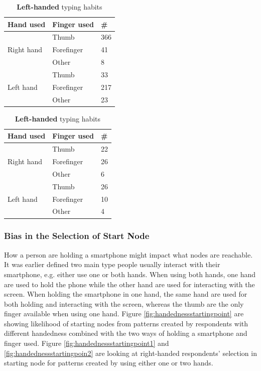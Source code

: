       \begin{table}[H]
        \parbox{.5\linewidth}{
          \centering
          \begin{tabular}{ l | l | l }
            \hline
            {\bf Hand used} & {\bf Finger used} & {\bf \#} \\ \hline
            \multirow{3}{*}{Right hand} & Thumb & 366 \\
            & Forefinger & 41 \\
            & Other & 8 \\ \hline
            \multirow{3}{*}{Left hand} & Thumb & 33 \\
            & Forefinger & 217 \\
            & Other & 23 \\ \hline
          \end{tabular}
          \caption{{\bf Right-handed} typing habits}
          \label{tab:righthandfinger}
        }
        \hfill
        \parbox{.5\linewidth}{
          \centering
          \begin{tabular}{ l | l | l }
            \hline
            {\bf Hand used} & {\bf Finger used} & {\bf \#} \\ \hline
            \multirow{3}{*}{Right hand} & Thumb & 22 \\ 
            & Forefinger & 26 \\
            & Other & 6 \\ \hline
            \multirow{3}{*}{Left hand} & Thumb & 26 \\ 
            & Forefinger & 10 \\
            & Other & 4 \\ \hline
          \end{tabular}
          \caption{{\bf Left-handed} typing habits}
          \label{tab:lefthandfinger}
        }
      \end{table}

    \subsubsection{Bias in the Selection of Start Node}
      How a person are holding a smartphone might impact what nodes are reachable. It was earlier defined two main type people usually interact with their smartphone, e.g. either use one or both hands. When using both hands, one hand are used to hold the phone while the other hand are used for interacting with the screen. When holding the smartphone in one hand, the same hand are used for both holding and interacting with the screen, whereas the thumb are the only finger available when using one hand. Figure \ref{fig:handednessstartingpoint} are showing likelihood of starting nodes from patterns created by respondents with different handedness combined with the two ways of holding a smartphone and finger used. Figure \ref{fig:handednessstartingpoint1} and \ref{fig:handednessstartingpoin2} are looking at right-handed respondents' selection in starting node for patterns created by using either one or two hands. 

